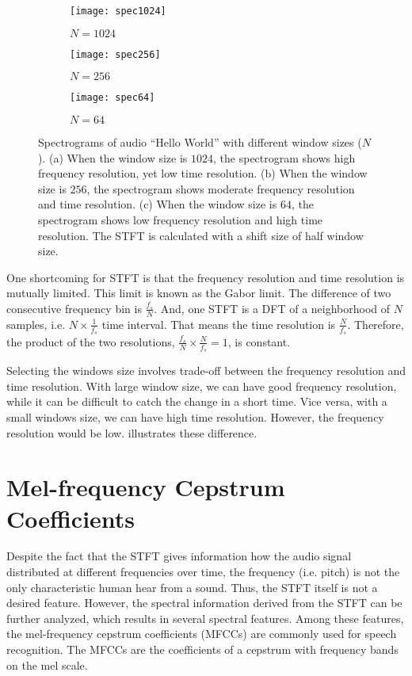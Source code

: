 \documentclass[12pt,final,twoside]{report}
\begin{document}
\begin{figure}[t]
  \centering
  \begin{subfigure}[b]{.8\textwidth}
    \texttt{[image: spec1024]}
    \caption{$N=1024$}
    \label{fig:spec1024}
  \end{subfigure}

  \begin{subfigure}[b]{.8\textwidth}
    \texttt{[image: spec256]}
    \caption{$N=256$}
    \label{fig:spec256}
  \end{subfigure}

  \begin{subfigure}[b]{.8\textwidth}
    \texttt{[image: spec64]}
    \caption{$N=64$}
    \label{fig:spec64}
  \end{subfigure}

  \caption[Spectrograms with different window sizes]{Spectrograms of audio ``Hello World'' with different window sizes ($N$). (a) When the window size is $1024$, the spectrogram shows high frequency resolution, yet low time resolution.
    (b) When the window size is $256$, the spectrogram shows moderate frequency resolution and time resolution.
    (c) When the window size is $64$, the spectrogram shows low frequency resolution and high time resolution.
  The STFT is calculated with a shift size of half window size. }
  \label{fig:spec}
\end{figure}

One shortcoming for STFT is that the frequency resolution and time resolution is mutually limited. This limit is known as the Gabor limit. The difference of two consecutive frequency bin is $\frac{f_s}{N}$. And, one STFT is a DFT of a neighborhood of $N$ samples, i.e. $N \times \frac{1}{f_s}$ time interval. That means the time resolution is $\frac{N}{f_s}$. Therefore, the product of the two resolutions, $\frac{f_s}{N} \times \frac{N}{f_s} = 1$, is constant. 

Selecting the windows size involves trade-off between the frequency resolution and time resolution. With large window size, we can have good frequency resolution, while it can be difficult to catch the change in a short time. Vice versa, with a small windows size, we can have high time resolution. However, the frequency resolution would be low.  illustrates these difference.

\section{Mel-frequency Cepstrum Coefficients}
Despite the fact that the STFT gives information how the audio signal distributed at different frequencies over time, the frequency (i.e. pitch) is not the only characteristic human hear from a sound. Thus, the STFT itself is not a desired feature. However, the spectral information derived from the STFT can be further analyzed, which results in several spectral features. Among these features, the mel-frequency cepstrum coefficients (MFCCs) are commonly used for speech recognition.
The MFCCs are the coefficients of a cepstrum with frequency bands on the mel scale.
\end{document}
